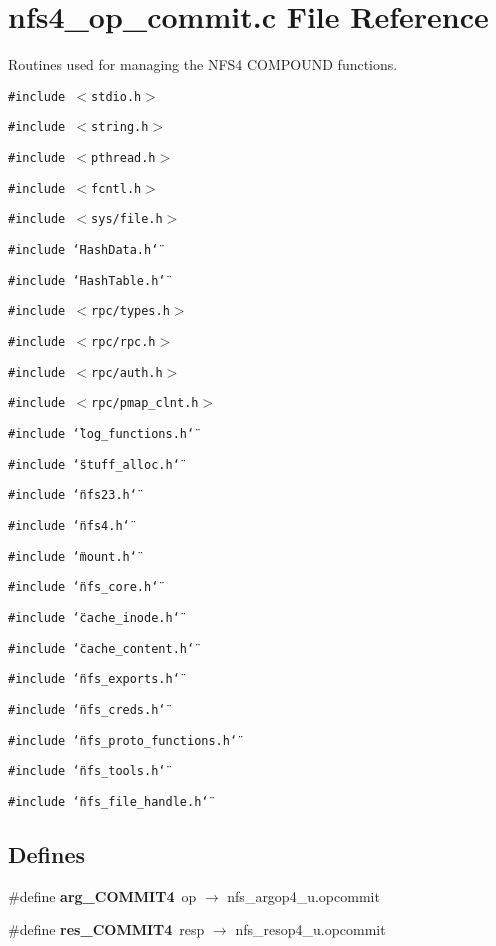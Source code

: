 \section{nfs4\_\-op\_\-commit.c File Reference}
\label{nfs4__op__commit_8c}
Routines used for managing the NFS4 COMPOUND functions. 

{\tt \#include $<$stdio.h$>$}\par
{\tt \#include $<$string.h$>$}\par
{\tt \#include $<$pthread.h$>$}\par
{\tt \#include $<$fcntl.h$>$}\par
{\tt \#include $<$sys/file.h$>$}\par
{\tt \#include \char`\"{}Hash\-Data.h\char`\"{}}\par
{\tt \#include \char`\"{}Hash\-Table.h\char`\"{}}\par
{\tt \#include $<$rpc/types.h$>$}\par
{\tt \#include $<$rpc/rpc.h$>$}\par
{\tt \#include $<$rpc/auth.h$>$}\par
{\tt \#include $<$rpc/pmap\_\-clnt.h$>$}\par
{\tt \#include \char`\"{}log\_\-functions.h\char`\"{}}\par
{\tt \#include \char`\"{}stuff\_\-alloc.h\char`\"{}}\par
{\tt \#include \char`\"{}nfs23.h\char`\"{}}\par
{\tt \#include \char`\"{}nfs4.h\char`\"{}}\par
{\tt \#include \char`\"{}mount.h\char`\"{}}\par
{\tt \#include \char`\"{}nfs\_\-core.h\char`\"{}}\par
{\tt \#include \char`\"{}cache\_\-inode.h\char`\"{}}\par
{\tt \#include \char`\"{}cache\_\-content.h\char`\"{}}\par
{\tt \#include \char`\"{}nfs\_\-exports.h\char`\"{}}\par
{\tt \#include \char`\"{}nfs\_\-creds.h\char`\"{}}\par
{\tt \#include \char`\"{}nfs\_\-proto\_\-functions.h\char`\"{}}\par
{\tt \#include \char`\"{}nfs\_\-tools.h\char`\"{}}\par
{\tt \#include \char`\"{}nfs\_\-file\_\-handle.h\char`\"{}}\par
\subsection*{Defines}
\begin{CompactItemize}
\item 
\#define {\bf arg\_\-COMMIT4}\ op $\rightarrow$ nfs\_\-argop4\_\-u.opcommit
\item 
\#define {\bf res\_\-COMMIT4}\ resp $\rightarrow$ nfs\_\-resop4\_\-u.opcommit
\end{CompactItemize}
